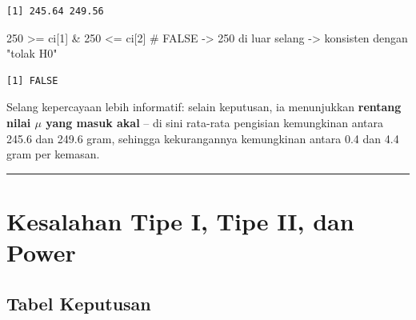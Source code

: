 \documentclass[
  indonesian,
  letterpaper,
]{book}
\newenvironment{Shaded}{\begin{snugshade}}{\end{snugshade}}
\newcommand{\CommentTok}[1]{\textcolor[rgb]{0.37,0.37,0.37}{#1}}
\newcommand{\DecValTok}[1]{\textcolor[rgb]{0.68,0.00,0.00}{#1}}
\newcommand{\NormalTok}[1]{\textcolor[rgb]{0.00,0.23,0.31}{#1}}
\newcommand{\SpecialCharTok}[1]{\textcolor[rgb]{0.37,0.37,0.37}{#1}}
\begin{document}
\begin{verbatim}
[1] 245.64 249.56
\end{verbatim}

\begin{Shaded}
\begin{Highlighting}[]
\DecValTok{250} \SpecialCharTok{\textgreater{}=}\NormalTok{ ci[}\DecValTok{1}\NormalTok{] }\SpecialCharTok{\&} \DecValTok{250} \SpecialCharTok{\textless{}=}\NormalTok{ ci[}\DecValTok{2}\NormalTok{]    }\CommentTok{\# FALSE {-}\textgreater{} 250 di luar selang {-}\textgreater{} konsisten dengan "tolak H0"}
\end{Highlighting}
\end{Shaded}

\begin{verbatim}
[1] FALSE
\end{verbatim}

Selang kepercayaan lebih informatif: selain keputusan, ia menunjukkan
\textbf{rentang nilai \(\mu\) yang masuk akal} -- di sini rata-rata
pengisian kemungkinan antara 245.6 dan 249.6 gram, sehingga
kekurangannya kemungkinan antara 0.4 dan 4.4 gram per kemasan.

\begin{center}\rule{0.5\linewidth}{0.5pt}\end{center}


\chapter{Kesalahan Tipe I, Tipe II, dan
Power}\label{kesalahan-tipe-i-tipe-ii-dan-power}

\section{Tabel Keputusan}\label{tabel-keputusan}
\end{document}
